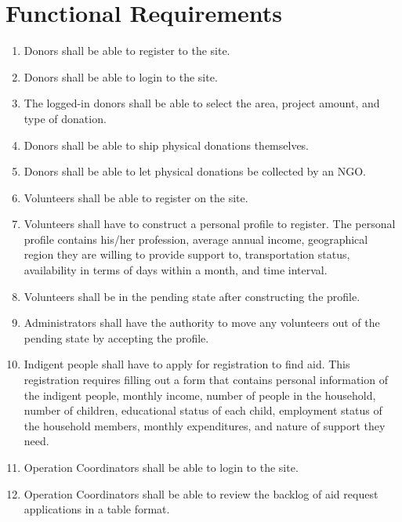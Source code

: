 \documentclass[a4paper,12pt]{report}
\begin{document}
	\chapter{Functional Requirements}
	\begin{enumerate}
		 	\item Donors shall be able to register to the site.
		
			\item Donors shall be able to login to the site.
			\item The logged-in donors shall be able to select the area, project amount, and type of donation.
			
			\item Donors shall be able to ship physical donations themselves.
			
			\item Donors shall be able to let physical donations be collected by an NGO.
			
			\item Volunteers shall be able to register on the site.
			
			\item Volunteers shall have to construct a personal profile to register. The personal profile contains his/her profession, average annual income, geographical region they are willing to provide support to, transportation status, availability in terms of days within a month, and time interval.
			
			\item Volunteers shall be in the pending state after constructing the profile.
			
			\item  Administrators shall have the authority to move any volunteers out of the pending state by accepting the profile.
			
			\item Indigent people shall have to apply for registration to find aid. This registration requires filling out a form that contains personal information of the indigent people, monthly income, number of people in the household, number of children, educational status of each child, employment status of the household members, monthly expenditures, and nature of support they need.
			
			\item Operation Coordinators shall be able to login to the site.
			
			\item Operation Coordinators shall be able to review the backlog of aid request applications in a table format.
			

\end{enumerate}
\end{document}
